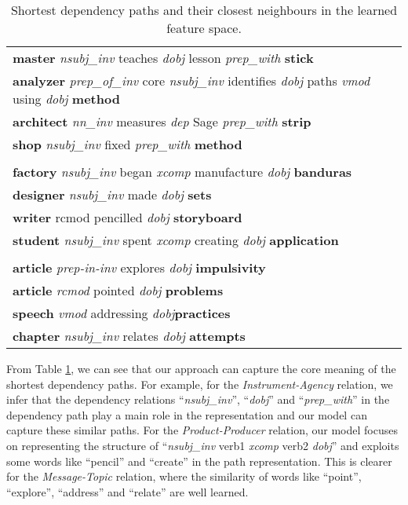 \documentclass[11pt]{article}
\begin{document}
\begin{table}[h]
\small
\center
\renewcommand\arraystretch{1.2}
\begin{tabular}{|p{7.2cm}|}
\hhline{|=|}
 \multicolumn{1}{|c|}{Instrument-Agency}\\
 \hline
\textbf{master} \textit{nsubj\_inv} teaches \textit{dobj} lesson \textit{prep\_with} \textbf{stick} \\
\hline
\textbf{analyzer} \textit{prep\_of\_inv} core \textit{nsubj\_inv} identifies \textit{dobj} paths \textit{vmod} using \textit{dobj} \textbf{method} \\
\textbf{architect} \textit{nn\_inv} measures \textit{dep} Sage \textit{prep\_with} \textbf{strip}\\
\textbf{shop} \textit{nsubj\_inv} fixed \textit{prep\_with} \textbf{method}\\
\hhline{|=|}
\multicolumn{1}{|c|}{Product-Producer}\\
\hline
\textbf{factory} \textit{nsubj\_inv} began \textit{xcomp} manufacture  \textit{dobj} \textbf{banduras}\\
\hline
 \textbf{designer} \textit{nsubj\_inv} made \textit{dobj} \textbf{sets} \\
 \textbf{writer} rcmod pencilled \textit{dobj} \textbf{storyboard}\\
 \textbf{student} \textit{nsubj\_inv} spent \textit{xcomp} creating \textit{dobj} \textbf{application}\\
\hhline{|=|}
\multicolumn{1}{|c|}{Message-Topic}\\
\hline
\textbf{article} \textit{prep-in-inv} explores \textit{dobj} \textbf{impulsivity} \\
\hline
\textbf{article} \textit{rcmod} pointed \textit{dobj} \textbf{problems} \\
\textbf{speech} \textit{vmod} addressing \textit{dobj}\textbf{practices}\\
\textbf{chapter} \textit{nsubj\_inv} relates \textit{dobj} \textbf{attempts}\\
\hline
\end{tabular}
\caption{Shortest dependency paths and their closest neighbours in the learned feature space.}\label{tab:4}
\end{table}

From Table \ref{tab:4}, we can see that our approach can capture the core meaning of the shortest dependency paths.
For example, for the \textit{Instrument-Agency} relation, we infer that the dependency relations ``\textit{nsubj\_inv}'', ``\textit{dobj}'' and ``\textit{prep\_with}'' in the dependency path play a main role in the representation and our model can capture these similar paths.
For the \textit{Product-Producer} relation, our model focuses on representing the structure of ``\textit{nsubj\_inv} verb1 \textit{xcomp} verb2 \textit{dobj}'' and exploits some words like ``pencil'' and ``create'' in the path representation.
This is clearer for the \textit{Message-Topic} relation, where the similarity of words like ``point'', ``explore'', ``address'' and ``relate'' are well learned.
\end{document}
